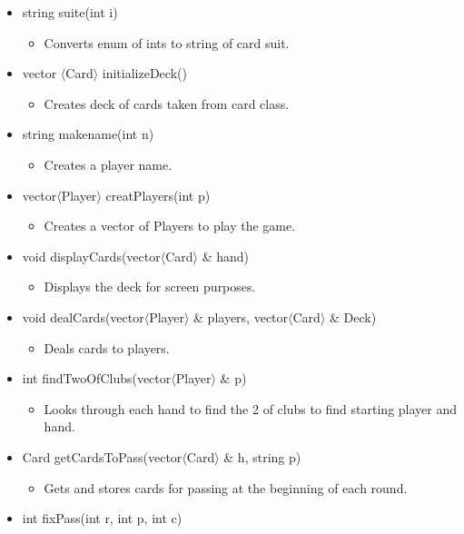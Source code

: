 \documentclass[]{scrartcl}
\begin{document}
 \begin{itemize}
 	\item string suite(int i)
 		\begin{itemize}
 			\item Converts enum of ints to string of card suit.
 		\end{itemize}
 	\item vector $\langle$Card$\rangle$ initializeDeck()
 		\begin{itemize}
 			\item Creates deck of cards taken from card class.
 		\end{itemize}
 	\item string makename(int n)
 		\begin{itemize}
 			\item 	Creates a player name.
 		\end{itemize}
 	\item vector$\langle$Player$\rangle$  creatPlayers(int p)
 		\begin{itemize}
 			\item Creates a vector of Players to play the game.
 		\end{itemize}
 	\item void displayCards(vector$\langle$Card$\rangle$ \& hand)
 		\begin{itemize}
 			\item Displays the deck for screen purposes.
 		\end{itemize}
 	\item void dealCards(vector$\langle$Player$\rangle$ \& players, vector$\langle$Card$\rangle$ \& Deck)
 		\begin{itemize}
 			\item Deals cards to players.
 		\end{itemize}
 	\item int findTwoOfClubs(vector$\langle$Player$\rangle$ \& p)
 		\begin{itemize}
 			\item Looks through each hand to find the 2 of clubs to find starting player and hand.
 		\end{itemize}
 	\item Card getCardsToPass(vector$\langle$Card$\rangle$ \& h, string p)
 		\begin{itemize}
 			\item Gets and stores cards for passing at the beginning of each round.
 		\end{itemize}
 	\item int fixPass(int r, int p, int c)

\end{itemize}
\end{document}
